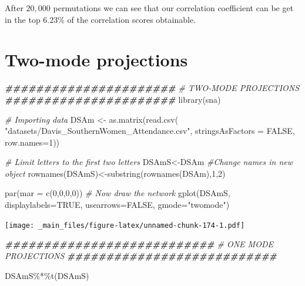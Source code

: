 \documentclass[
  notitlepage,
  onecolumn,
  openany]{book}
\newenvironment{Shaded}{\begin{snugshade}}{\end{snugshade}}
\newcommand{\AttributeTok}[1]{\textcolor[rgb]{0.77,0.63,0.00}{#1}}
\newcommand{\CommentTok}[1]{\textcolor[rgb]{0.56,0.35,0.01}{\textit{#1}}}
\newcommand{\ConstantTok}[1]{\textcolor[rgb]{0.00,0.00,0.00}{#1}}
\newcommand{\DecValTok}[1]{\textcolor[rgb]{0.00,0.00,0.81}{#1}}
\newcommand{\DocumentationTok}[1]{\textcolor[rgb]{0.56,0.35,0.01}{\textbf{\textit{#1}}}}
\newcommand{\FunctionTok}[1]{\textcolor[rgb]{0.00,0.00,0.00}{#1}}
\newcommand{\NormalTok}[1]{#1}
\newcommand{\OtherTok}[1]{\textcolor[rgb]{0.56,0.35,0.01}{#1}}
\newcommand{\SpecialCharTok}[1]{\textcolor[rgb]{0.00,0.00,0.00}{#1}}
\newcommand{\StringTok}[1]{\textcolor[rgb]{0.31,0.60,0.02}{#1}}
\begin{document}
After \(20,000\) permutations we can see that our correlation coefficient can be get in the top 6.23\% of the correlation scores obtainable.

\hypertarget{two-mode-projections}{%
\chapter{Two-mode projections}\label{two-mode-projections}}

\begin{Shaded}
\begin{Highlighting}[]
\DocumentationTok{\#\#\#\#\#\#\#\#\#\#\#\#\#\#\#\#\#\#\#\#\#\#}
\CommentTok{\# TWO{-}MODE PROJECTIONS}
\DocumentationTok{\#\#\#\#\#\#\#\#\#\#\#\#\#\#\#\#\#\#\#\#\#\#}
\FunctionTok{library}\NormalTok{(sna)}

\CommentTok{\# Importing data}
\NormalTok{DSAm }\OtherTok{\textless{}{-}} \FunctionTok{as.matrix}\NormalTok{(}\FunctionTok{read.csv}\NormalTok{(}
    \StringTok{"datasets/Davis\_SouthernWomen\_Attendance.csv"}\NormalTok{,}
    \AttributeTok{stringsAsFactors =} \ConstantTok{FALSE}\NormalTok{, }\AttributeTok{row.names=}\DecValTok{1}\NormalTok{))}


\CommentTok{\# Limit letters to the first two letters}
\NormalTok{DSAmS}\OtherTok{\textless{}{-}}\NormalTok{DSAm}
\CommentTok{\#Change names in new object}
\FunctionTok{rownames}\NormalTok{(DSAmS)}\OtherTok{\textless{}{-}}\FunctionTok{substring}\NormalTok{(}\FunctionTok{rownames}\NormalTok{(DSAm),}\DecValTok{1}\NormalTok{,}\DecValTok{2}\NormalTok{)}

\FunctionTok{par}\NormalTok{(}\AttributeTok{mar =} \FunctionTok{c}\NormalTok{(}\DecValTok{0}\NormalTok{,}\DecValTok{0}\NormalTok{,}\DecValTok{0}\NormalTok{,}\DecValTok{0}\NormalTok{))}
\CommentTok{\# Now draw the network}
\FunctionTok{gplot}\NormalTok{(DSAmS, }\AttributeTok{displaylabels=}\ConstantTok{TRUE}\NormalTok{, }
      \AttributeTok{usearrows=}\ConstantTok{FALSE}\NormalTok{, }\AttributeTok{gmode=}\StringTok{"twomode"}\NormalTok{)}
\end{Highlighting}
\end{Shaded}

\texttt{[image: \_main\_files/figure-latex/unnamed-chunk-174-1.pdf]}

\begin{Shaded}
\begin{Highlighting}[]
\DocumentationTok{\#\#\#\#\#\#\#\#\#\#\#\#\#\#\#\#\#\#\#\#\#\#\#\#\#\#\#}
\CommentTok{\# ONE MODE PROJECTIONS}
\DocumentationTok{\#\#\#\#\#\#\#\#\#\#\#\#\#\#\#\#\#\#\#\#\#\#\#\#\#\#\#}

\NormalTok{DSAmS}\SpecialCharTok{\%*\%}\FunctionTok{t}\NormalTok{(DSAmS)}
\end{Highlighting}
\end{Shaded}
\end{document}
